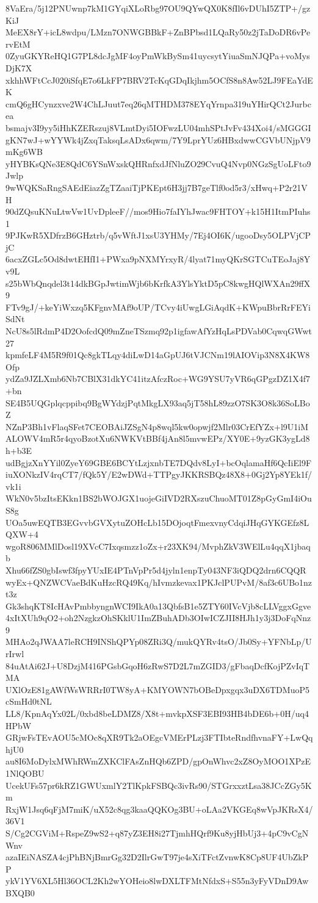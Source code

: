 8VaEra/5j12PNUwnp7kM1GYqiXLoRbg97OU9QYwQX0K8fIl6vDUhI5ZTP+/gzKiJ
MeEX8rY+icL8wdpu/LMzn7ONWGBBkF+ZnBPbsd1LQaRy50z2jTaDoDR6vPervEtM
0ZyuGKYReHQ1G7PL8dcJgMF4oyPmWkBySm41uycsytYiuaSmNJQPa+voMysDjK7X
xkhhWFtCcJ020iSfqE7o6LkFP7BRV2TcKqGDqIkjhm5OCfS8n8Aw52LJ9FEaYdEK
cmQ6gHCynzxve2W4ChLJuut7eq26qMTHDM378EYqYrnpa319uYHirQCt2Jurbcea
bsmajv3I9yy5iHhKZERszuj8VLmtDyi5IOFwzLU04mhSPtJvFv434Xoi4/sMGGGI
gKN7wJ+wYYWk4jZxqTaksqLsADx6qwm/7Y9LprYUz6HBxdwwCGVbUNjpV9mKg6WB
yHYBKsQNe3E8QdC6YSnWxskQHRnfxdJfNluZO29CvuQ4Nvp0NGzSgUoLFto9Jwlp
9wWQKSaRngSAEdEiazZgTZaaiTjPKEpt6H3jj7B7geTlf0od5r3/xHwq+P2r21VH
90dZQsuKNuLtwVw1UvDpleeF//mos9Hio7faIYhJwac9FHTOY+k15H1ItmPIuhs1
9PJKwR5XDfrzB6GHztrb/q5vWftJ1xsU3YHMy/7Ej4OI6K/ugooDsy5OLPVjCPjC
6acxZGLc5Od8dwtEHfI1+PWxa9pNXMYrxyR/4lyat71myQKrSGTCuTEoJaj8Yv9L
s25bWbQnqdel3t14dkBGpJwtimWjb6bKrfkA3YlsYktD5pC8kwgHQlWXAn29ffX9
FTv9gJ/+keYiWxzq5KFgnvMAf9oUP/TCvy4iUwgLGiAqdK+KWpuBbrRrFEYiSdNt
NcU8s5lRdmP4D2OofcdQ09mZneTSzmq92p1igfawAfYzHqLsPDVab0CqwqGWwt27
kpmfeLF4M5R9f01Qc8gkTLqy4diLwD14aGpUJ6tVJCNm19lAIOVip3N8X4KW8Ofp
ydZa9JZLXmb6Nb7CBlX31dkYC41itzAfczRoc+WG9YSU7yVR6qGPgzDZ1X4f7+bn
SE4B5UQGplqcppibq9BgWYdzjPqtMkgLX93aq5jT58hL89zzO7SK3O8k36SoLBoZ
NZnP3Bh1vFlaqSFet7CEOBAiJZSgN4p8wql5kw0opwjf2Mlr03CrEfYZx+l9U1iM
ALOWV4mR5r4qyoBzotXu6NWKVtBBf4jAn8l5mvwEPz/XY0E+9yzGK3ygLd8h+b3E
udBgjzXnYYil0ZyeY69GBE6BCYtLzjxnbTE7DQdv8LyI+bcOqlamaHf6QcIiEl9F
iuXONkzIV4rqCT7/fQk5Y/E2wDWd+TTPgyJKKRSBQz48X8+0Gj2Yp8YEk1f/vk1i
WkN0v5bzItsEKkn1BS2bWOJGX1uojeGiIVD2RXszuChuoMT01Z8pGyGmI4iOuS8g
UOa5uwEQTB3EGvvbGVXytuZOHcLb15DOjoqtFmexvnyCdqiJHqGYKGEfz8LQXW+4
wgoR806MMlDosl19XVcC7Ixqsmzz1oZx+r23XK94/MvphZkV3WElLu4qqX1jbaqb
Xhu66fZS0gbIswf3fpyYUxIE4PTnVpPr5d4jyln1enpTy043NF3iQDQ2drn6CQQR
wyEx+QNZWCVaeBdKuHzcRQ49Kq/hIvmzkevax1PKJclPUPvM/8af3c6UBo1nzt3z
Gk3shqKT8IcHAvPmbbyngnWCI9IkA0a13QbfsB1e5ZTY60IVcVjb8cLLVggxGgve
4xItXUh9qO2+oh2NzgkzOhSKklU1ImZBuhADb3OIwICZJII8HJh1y3j3DoFqNnz9
MHAo2qJWAA7leRCH9INShQPYp08ZRi3Q/mukQYRv4tsO/Jb0Sy+YFNbLp/UrIrwl
84uAtAi62J+U8DzjM416PGsbGqoH6zRwS7D2L7mZGID3/gFbaqDcfKojPZvIqTMA
UXlOzE81gAWfWsWRRrI0TW8yA+KMYOWN7bOBeDpxgqx3uDX6TDMuoP5cSmHd0tNL
LL8/KpnAqYx02L/0xbd8beLDMZ8/X8t+mvkpXSF3EBI93HB4bDE6b+0H/uq4HPbW
GRjwFsTEvAOU5cMOc8qXR9Tk2aOEgcVMErPLzj3FTIbteRndfhvnaFY+LwQqhjU0
au8I6MoDylxMWhRWmZXKClFAsZnHQb6ZPD/gpOnWhvc2xZ8OyMOO1XPzE1NlQOBU
UcekUFs57pr6kRZ1GWUxmlY2TlKpkFSBQc3ivRs90/STGrxxztLsa38JCcZGy5Km
RxjW1Jsq6qFjM7miK/uX52c8qg3kaaQQKOg3BU+oLAa2VKGEq8wVpJKRsX4/36V1
S/Cg2CGViM+RspeZ9wS2+q87yZ3EH8i27TjmhHQrf9Ku8yjHbUj3+4pC9vCgNWnv
azaIEiNASZA4cjPhBNjBmrGg32D2IlrGwT97je4sXiTFctZvnwK8Cp8UF4UbZkPP
ykV1YV6XL5Hl36OCL2Kh2wYOHeio8lwDXLTFMtNfdxS+S55n3yFyVDnD9AwBXQB0
